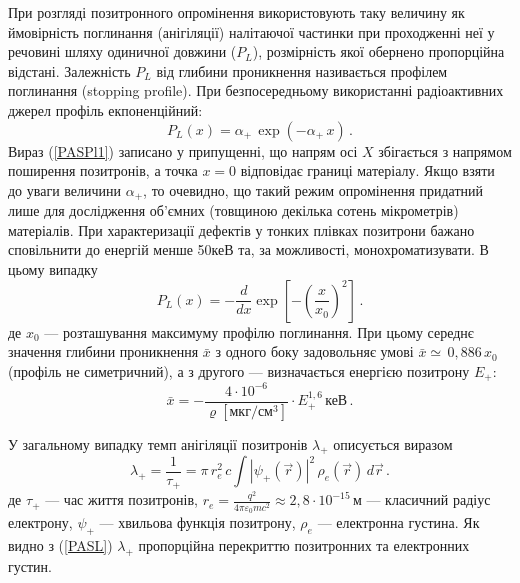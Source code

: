 \documentclass[10pt,a5paper,titlepage,oneside]{book}
\numberwithin{equation}{part}
\begin{document}
При розгляді позитронного опромінення використовують
таку величину як ймовірність поглинання (анігіляції) налітаючої частинки
при проходженні неї у речовині шляху одиничної довжини ($P_L$),
розмірність якої обернено пропорційна відстані.
Залежність $P_L$ від глибини проникнення називається профілем поглинання (stopping profile).
При безпосередньому використанні радіоактивних джерел профіль екпоненційний:
\begin{equation}\label{PASPl1}
P_L(x)=\alpha_+\,\exp(-\alpha_+\,x)\,.
\end{equation}
Вираз (\ref{PASPl1}) записано у припущенні, що 
напрям осі $X$ збігається з напрямом поширення позитронів,
а точка $x=0$ відповідає границі матеріалу.
Якщо взяти до уваги величини $\alpha_+$, то очевидно,
що такий режим опромінення придатний лише для дослідження об'ємних
(товщиною декілька сотень мікрометрів) матеріалів.
При характеризації дефектів у тонких плівках позитрони
бажано сповільнити до енергій менше 50кеВ та, за можливості, монохроматизувати.
В цьому випадку
\begin{equation}\label{PASPl2}
P_L(x)=-\frac{d}{dx}\exp\left[-\left(\frac{x}{x_0}\right)^2\right]\,.
\end{equation}
де
$x_0$ --- розташування максимуму профілю поглинання.
При цьому середнє значення глибини проникнення $\bar{x}$  з одного боку 
задовольняє умові $\bar{x}\simeq \,0,886\, x_0$ (профіль не симетричний),
а з другого --- визначається енергією позитрону $E_{+}$:
\begin{equation}
\bar{x}=-\frac{4\cdot10^{-6}}{\varrho\left[\text{мкг}/\text{см}^3\right]}\cdot E_{+}^{1,6}\,\text{кеВ}\,.
\end{equation}

У загальному випадку темп анігіляції позитронів $\lambda_+$ описується виразом
\begin{equation}\label{PASL}
\lambda_+=\frac{1}{\tau_+}=\pi\,r_e^2\,c\int\left|\psi_+(\overrightarrow{r})\right|^2\,\rho_e(\overrightarrow{r})\,d\overrightarrow{r}\,.
\end{equation}
де
$\tau_+$ --- час життя позитронів,
$r_e=\frac{q^2}{4\pi\varepsilon_0 m c^2}\approx2,8\cdot10^{-15}\,\text{м}$ --- класичний радіус електрону,
$\psi_+$ --- хвильова функція позитрону,
$\rho_e$ --- електронна густина.
Як видно з (\ref{PASL})  $\lambda_+$ пропорційна перекриттю позитронних та електронних густин.
\end{document}
